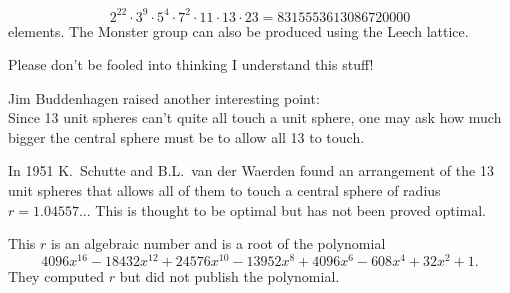 \[2^{22} \cdot 3^9 \cdot 5^4 \cdot 7^2 \cdot 11 \cdot 13 \cdot 23 = 8315553613086720000\]
%
elements. The Monster group can also be produced using the Leech lattice.

Please don't be fooled into thinking I understand this stuff!

Jim Buddenhagen raised another interesting point:
\\
Since 13 unit spheres can't quite all touch a unit sphere, one may ask how much bigger the central sphere must be to allow all 13 to touch.

In 1951 K.\ Schutte and B.L.\ van der Waerden found an arrangement of the 13 unit spheres that allows all of them to touch a central sphere of radius $r=1.04557...$ This is thought to be optimal but has not been proved optimal.

This $r$ is an algebraic number and is a root of the polynomial
%
\[4096 x^{16} - 18432 x^{12} + 24576 x^{10} - 13952 x^8 + 4096 x^6 - 608 x^4 + 32 x^2 + 1.\]
%
They computed $r$ but did not publish the polynomial.
